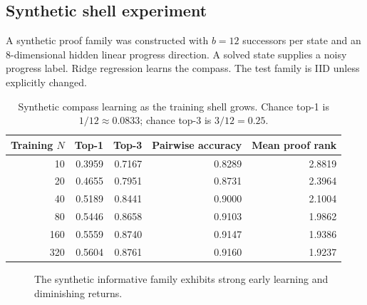 \documentclass[11pt]{article}
\begin{document}
\subsection{Synthetic shell experiment}

A synthetic proof family was constructed with \(b=12\) successors per state and an 8-dimensional hidden linear progress direction. A solved state supplies a noisy progress label. Ridge regression learns the compass. The test family is IID unless explicitly changed.

\begin{table}[ht]
\centering
\caption{Synthetic compass learning as the training shell grows. Chance top-1 is \(1/12\approx0.0833\); chance top-3 is \(3/12=0.25\).}
\begin{tabular}{rrrrr}
\toprule
Training \(N\) & Top-1 & Top-3 & Pairwise accuracy & Mean proof rank\\
\midrule
10  & 0.3959 & 0.7167 & 0.8289 & 2.8819\\
20  & 0.4655 & 0.7951 & 0.8731 & 2.3964\\
40  & 0.5189 & 0.8441 & 0.9000 & 2.1004\\
80  & 0.5446 & 0.8658 & 0.9103 & 1.9862\\
160 & 0.5559 & 0.8740 & 0.9147 & 1.9386\\
320 & 0.5604 & 0.8761 & 0.9160 & 1.9237\\
\bottomrule
\end{tabular}
\end{table}

\begin{figure}[ht]
\centering
{}
\caption{The synthetic informative family exhibits strong early learning and diminishing returns.}
\end{figure}
\end{document}
